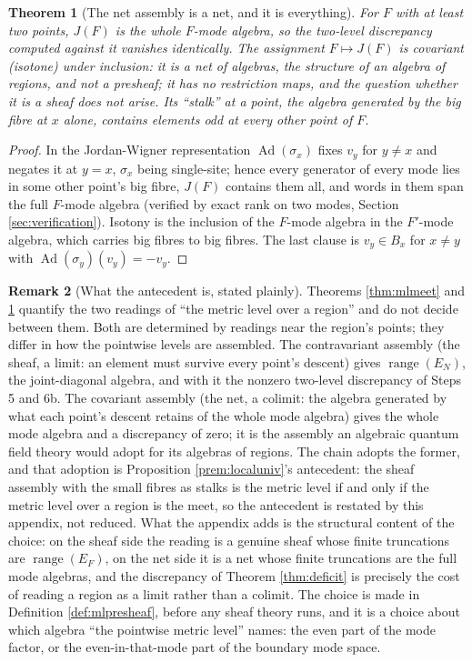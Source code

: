 \documentclass[11pt]{article}
\newtheorem{theorem}{Theorem}[section]
\theoremstyle{definition}
\newtheorem{remark}[theorem]{Remark}
\newcommand{\EN}{E_{N}}
\begin{document}
\begin{theorem}[The net assembly is a net, and it is everything]\label{thm:mljoin}
For $F$ with at least two points, $J(F)$ is the whole $F$-mode algebra, so the two-level discrepancy computed against it vanishes identically. The assignment $F \mapsto J(F)$ is covariant (isotone) under inclusion: it is a net of algebras, the structure of an algebra of regions, and not a presheaf; it has no restriction maps, and the question whether it is a sheaf does not arise. Its ``stalk'' at a point, the algebra generated by the big fibre at $x$ alone, contains elements odd at every other point of $F$.
\end{theorem}

\begin{proof}
In the Jordan-Wigner representation $\operatorname{Ad}(\sigma_x)$ fixes $v_y$ for $y \neq x$ and negates it at $y = x$, $\sigma_x$ being single-site; hence every generator of every mode lies in some other point's big fibre, $J(F)$ contains them all, and words in them span the full $F$-mode algebra (verified by exact rank on two modes, Section \ref{sec:verification}). Isotony is the inclusion of the $F$-mode algebra in the $F'$-mode algebra, which carries big fibres to big fibres. The last clause is $v_y \in B_x$ for $x \neq y$ with $\operatorname{Ad}(\sigma_y)(v_y) = -v_y$.
\end{proof}

\begin{remark}[What the antecedent is, stated plainly]\label{rem:mlresidue}
Theorems \ref{thm:mlmeet} and \ref{thm:mljoin} quantify the two readings of ``the metric level over a region'' and do not decide between them. Both are determined by readings near the region's points; they differ in how the pointwise levels are assembled. The contravariant assembly (the sheaf, a limit: an element must survive every point's descent) gives $\operatorname{range}(\EN)$, the joint-diagonal algebra, and with it the nonzero two-level discrepancy of Steps 5 and 6b. The covariant assembly (the net, a colimit: the algebra generated by what each point's descent retains of the whole mode algebra) gives the whole mode algebra and a discrepancy of zero; it is the assembly an algebraic quantum field theory would adopt for its algebras of regions. The chain adopts the former, and that adoption is Proposition \ref{prem:localuniv}'s antecedent: the sheaf assembly with the small fibres as stalks is the metric level if and only if the metric level over a region is the meet, so the antecedent is restated by this appendix, not reduced. What the appendix adds is the structural content of the choice: on the sheaf side the reading is a genuine sheaf whose finite truncations are $\operatorname{range}(E_F)$, on the net side it is a net whose finite truncations are the full mode algebras, and the discrepancy of Theorem \ref{thm:deficit} is precisely the cost of reading a region as a limit rather than a colimit. The choice is made in Definition \ref{def:mlpresheaf}, before any sheaf theory runs, and it is a choice about which algebra ``the pointwise metric level'' names: the even part of the mode factor, or the even-in-that-mode part of the boundary mode space.
\end{remark}
\end{document}

